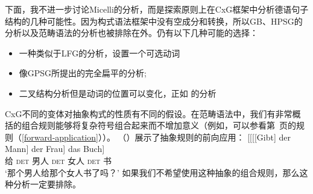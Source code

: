 下面，我不进一步讨论Micelli的分析，而是探索原则上在CxG框架中分析德语句子结构的几种可能性。因为构式语法框架中没有空成分和转换，所以GB、HPSG的分析以及范畴语法的分析也被排除在外。仍有以下几种可能的选择：
\begin{itemize}
\item 一种类似于LFG的分析，设置一个可选动词
\item 像GPSG所提出的完全扁平的分析;
\item 二叉结构分析但是动词的位置可以变化，正如 \citet[]{Steedman2000a-u}的分析
\end{itemize}
%
CxG不同的变体对抽象构式的性质有不同的假设。在范畴语法中，我们有非常概括的组合规则能够将复杂符号组合起来而不增加意义（例如，可以参看第~\pageref{forward-application}页的规则（\ref{forward-application}））。 （）展示了抽象规则的前向应用：
\ea
\gll {}[[[[Gibt] der Mann] der Frau] das Buch]\\
	 {}\spacebr{}\spacebr{}\spacebr{}\spacebr{}给 \textsc{det} 男人 \textsc{det} 女人 \textsc{det} 书\\
\glt `那个男人给那个女人书了吗？'
\z
如果我们不希望使用这种抽象的组合规则，那么这种分析一定要排除。

